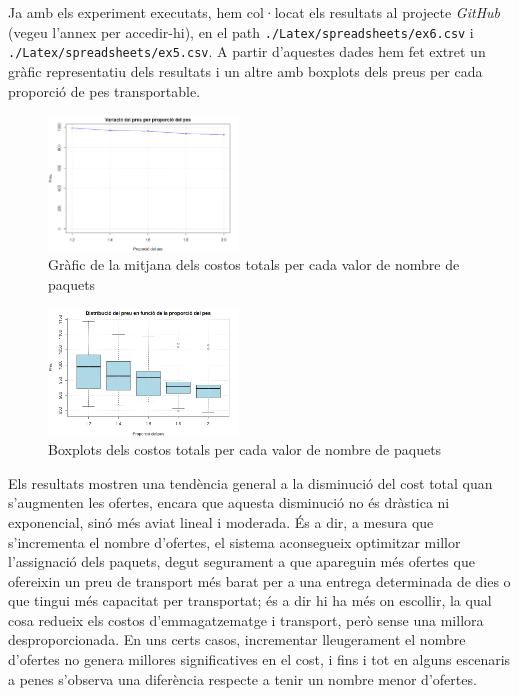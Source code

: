 \documentclass[a4paper]{article}
\begin{document}
	Ja amb els experiment executats, hem col·locat els resultats al projecte \textit{GitHub} (vegeu l'annex per accedir-hi), en el path \texttt{./Latex/spreadsheets/ex6.csv} i \texttt{./Latex/spreadsheets/ex5.csv}. A partir d'aquestes dades hem fet extret un gràfic representatiu dels resultats i un altre amb boxplots dels preus per cada proporció de pes transportable.
	
	\begin{figure}[H]
		\centering
		\includegraphics[width=0.45\textwidth]{exp5_grafic_lineal.png}
		\caption{Gràfic de la mitjana dels costos totals per cada valor de nombre de paquets}
		\label{fig:exp5_grafic_lineal}
	\end{figure}
	\begin{figure}[H]
		\centering
		\includegraphics[width=0.45\textwidth]{images/exp5_boxplot.png}
		\caption{Boxplots dels costos totals per cada valor de nombre de paquets}
		\label{fig:exp5_boxplot}
	\end{figure}
	
	Els resultats mostren una tendència general a la disminució del cost total quan s'augmenten les ofertes, encara que aquesta disminució no és dràstica ni exponencial, sinó més aviat lineal i moderada. És a dir, a mesura que s'incrementa el nombre d'ofertes, el sistema aconsegueix optimitzar millor l'assignació dels paquets, degut segurament a que apareguin més ofertes que ofereixin un preu de transport més barat per a una entrega determinada de dies o que tingui més capacitat per transportat; és a dir hi ha més on escollir, la qual cosa redueix els costos d'emmagatzematge i transport, però sense una millora desproporcionada. En uns certs casos, incrementar lleugerament el nombre d'ofertes no genera millores significatives en el cost, i fins i tot en alguns escenaris a penes s'observa una diferència respecte a tenir un nombre menor d'ofertes. \\
	
\end{document}

